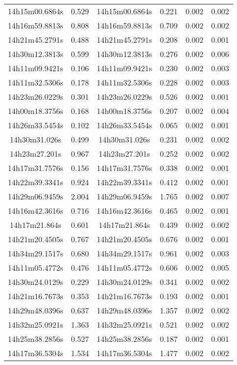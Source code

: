 \begin{table}
\begin{tabular}{cccccc}
14h15m00.6864s & 0.529 & 14h15m00.6864s & 0.221 & 0.002 & 0.002 \\
14h16m59.8813s & 0.808 & 14h16m59.8813s & 0.709 & 0.002 & 0.002 \\
14h21m45.2791s & 0.488 & 14h21m45.2791s & 0.208 & 0.002 & 0.001 \\
14h30m12.3813s & 0.599 & 14h30m12.3813s & 0.276 & 0.002 & 0.006 \\
14h11m09.9421s & 0.106 & 14h11m09.9421s & 0.230 & 0.002 & 0.003 \\
14h11m32.5306s & 0.178 & 14h11m32.5306s & 0.228 & 0.002 & 0.003 \\
14h23m26.0229s & 0.301 & 14h23m26.0229s & 0.526 & 0.002 & 0.001 \\
14h00m18.3756s & 0.168 & 14h00m18.3756s & 0.207 & 0.002 & 0.004 \\
14h26m33.5454s & 0.102 & 14h26m33.5454s & 0.065 & 0.002 & 0.001 \\
14h30m31.026s & 0.499 & 14h30m31.026s & 0.231 & 0.002 & 0.002 \\
14h23m27.201s & 0.967 & 14h23m27.201s & 0.252 & 0.002 & 0.002 \\
14h17m31.7576s & 0.156 & 14h17m31.7576s & 0.338 & 0.002 & 0.001 \\
14h22m39.3341s & 0.924 & 14h22m39.3341s & 0.412 & 0.002 & 0.001 \\
14h29m06.9459s & 2.004 & 14h29m06.9459s & 1.765 & 0.002 & 0.007 \\
14h16m42.3616s & 0.716 & 14h16m42.3616s & 0.465 & 0.002 & 0.001 \\
14h17m21.864s & 0.601 & 14h17m21.864s & 0.439 & 0.002 & 0.002 \\
14h21m20.4505s & 0.767 & 14h21m20.4505s & 0.676 & 0.002 & 0.001 \\
14h34m29.1517s & 0.680 & 14h34m29.1517s & 0.961 & 0.002 & 0.003 \\
14h11m05.4772s & 0.476 & 14h11m05.4772s & 0.606 & 0.002 & 0.005 \\
14h30m24.0129s & 0.229 & 14h30m24.0129s & 0.341 & 0.002 & 0.002 \\
14h21m16.7673s & 0.353 & 14h21m16.7673s & 0.193 & 0.002 & 0.001 \\
14h29m48.0396s & 0.637 & 14h29m48.0396s & 1.357 & 0.002 & 0.002 \\
14h32m25.0921s & 1.363 & 14h32m25.0921s & 0.521 & 0.002 & 0.002 \\
14h25m38.2856s & 0.527 & 14h25m38.2856s & 0.187 & 0.002 & 0.001 \\
14h17m36.5304s & 1.534 & 14h17m36.5304s & 1.477 & 0.002 & 0.002 \\

\end{tabular}
\end{table}
